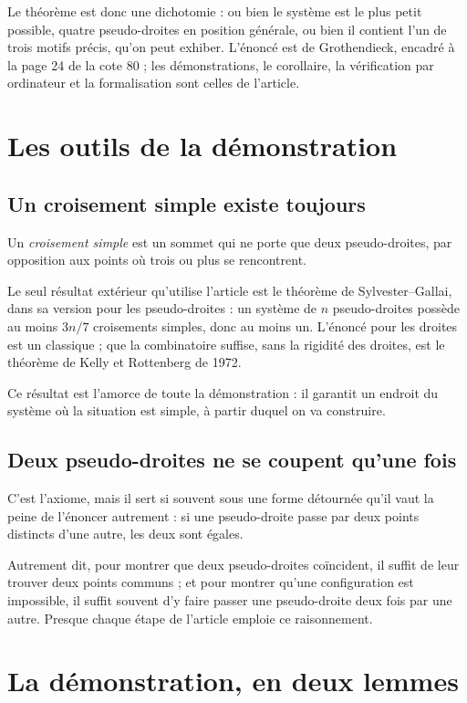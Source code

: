 \documentclass[11pt,a4paper]{amsart}
\theoremstyle{definition}
\theoremstyle{plain}
\theoremstyle{remark}
\begin{document}
Le théorème est donc une dichotomie : ou bien le système est le plus petit possible, quatre pseudo-droites en position générale, ou bien il contient l'un de trois motifs précis, qu'on peut exhiber. L'énoncé est de Grothendieck, encadré à la page 24 de la cote 80 ; les démonstrations, le corollaire, la vérification par ordinateur et la formalisation sont celles de l'article.

\section{Les outils de la démonstration}

\subsection{Un croisement simple existe toujours}

Un \emph{croisement simple} est un sommet qui ne porte que deux pseudo-droites, par opposition aux points où trois ou plus se rencontrent.

Le seul résultat extérieur qu'utilise l'article est le théorème de Sylvester--Gallai, dans sa version pour les pseudo-droites : un système de $n$ pseudo-droites possède au moins $3n/7$ croisements simples, donc au moins un. L'énoncé pour les droites est un classique ; que la combinatoire suffise, sans la rigidité des droites, est le théorème de Kelly et Rottenberg de 1972.

Ce résultat est l'amorce de toute la démonstration : il garantit un endroit du système où la situation est simple, à partir duquel on va construire.

\subsection{Deux pseudo-droites ne se coupent qu'une fois}

C'est l'axiome, mais il sert si souvent sous une forme détournée qu'il vaut la peine de l'énoncer autrement : si une pseudo-droite passe par deux points distincts d'une autre, les deux sont égales.

Autrement dit, pour montrer que deux pseudo-droites coïncident, il suffit de leur trouver deux points communs ; et pour montrer qu'une configuration est impossible, il suffit souvent d'y faire passer une pseudo-droite deux fois par une autre. Presque chaque étape de l'article emploie ce raisonnement.

\section{La démonstration, en deux lemmes}
\end{document}
